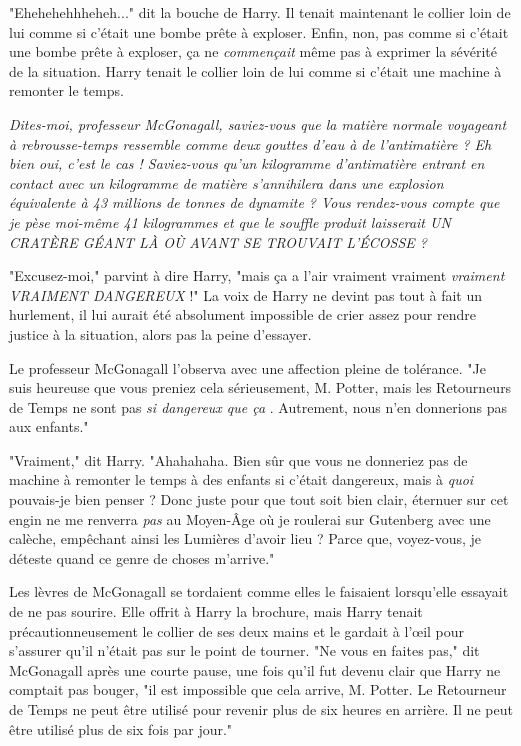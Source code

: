 "Ehehehehhheheh..." dit la bouche de Harry. Il tenait maintenant le collier loin de lui comme si c'était une bombe prête à exploser. Enfin, non, pas comme si c'était une bombe prête à exploser, ça ne \emph{commençait}  même pas à exprimer la sévérité de la situation. Harry tenait le collier loin de lui comme si c'était une machine à remonter le temps.

\emph{Dites-moi, professeur McGonagall, saviez-vous que la matière normale voyageant à rebrousse-temps ressemble comme deux gouttes d'eau à de l'antimatière ? Eh bien oui, c'est le cas ! Saviez-vous qu'un kilogramme d'antimatière entrant en contact avec un kilogramme de matière s'annihilera dans une explosion équivalente à 43 millions de tonnes de dynamite ? Vous rendez-vous compte que je pèse moi-même 41 kilogrammes et que le souffle produit laisserait UN CRATÈRE GÉANT LÀ OÙ AVANT SE TROUVAIT L'ÉCOSSE ?} 

"Excusez-moi," parvint à dire Harry, "mais ça a l'air vraiment vraiment \emph{vraiment}  \emph{VRAIMENT DANGEREUX}  !" La voix de Harry ne devint pas tout à fait un hurlement, il lui aurait été absolument impossible de crier assez pour rendre justice à la situation, alors pas la peine d'essayer.

Le professeur McGonagall l'observa avec une affection pleine de tolérance. "Je suis heureuse que vous preniez cela sérieusement, M. Potter, mais les Retourneurs de Temps ne sont pas \emph{si dangereux que ça} . Autrement, nous n'en donnerions pas aux enfants."

"Vraiment," dit Harry. "Ahahahaha. Bien sûr que vous ne donneriez pas de machine à remonter le temps à des enfants si c'était dangereux, mais à \emph{quoi}  pouvais-je bien penser ? Donc juste pour que tout soit bien clair, éternuer sur cet engin ne me renverra \emph{pas}  au Moyen-Âge où je roulerai sur Gutenberg avec une calèche, empêchant ainsi les Lumières d'avoir lieu ? Parce que, voyez-vous, je déteste quand ce genre de choses m'arrive."

Les lèvres de McGonagall se tordaient comme elles le faisaient lorsqu'elle essayait de ne pas sourire. Elle offrit à Harry la brochure, mais Harry tenait précautionneusement le collier de ses deux mains et le gardait à l'œil pour s'assurer qu'il n'était pas sur le point de tourner. "Ne vous en faites pas," dit McGonagall après une courte pause, une fois qu'il fut devenu clair que Harry ne comptait pas bouger, "il est impossible que cela arrive, M. Potter. Le Retourneur de Temps ne peut être utilisé pour revenir plus de six heures en arrière. Il ne peut être utilisé plus de six fois par jour."

